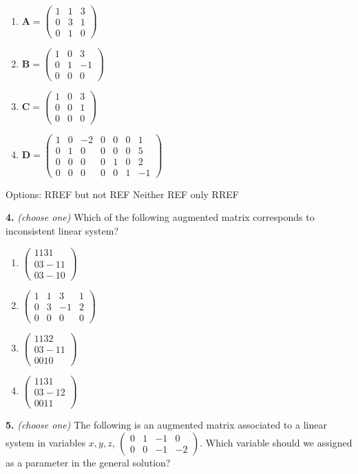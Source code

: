 \documentclass[10pt,a4paper]{article}
\begin{document}
\begin{enumerate}[label=(\alph*)]
\item \(\mathbf{A}=\left(\begin{array}{cc|c}1&1&3\\0&3&1\\0&1&0\end{array}\right)\)
\item \(\mathbf{B}=\left(\begin{array}{cc|c}1&0&3\\0&1&-1\\0&0&0\end{array}\right)\)
\item \(\mathbf{C}=\left(\begin{array}{cc|c}1&0&3\\0&0&1\\0&0&0\end{array}\right)\)
\item \(\mathbf{D}=\left(\begin{array}{cccccc|c}1&0&-2&0&0&0&1\\0&1&0&0&0&0&5\\0&0&0&0&1&0&2\\0&0&0&0&0&1&-1\end{array}\right)\)
\end{enumerate}
\quad Options: RREF but not REF \textbar{} Neither \textbar{} REF only \textbar{} RREF

\smallskip
\textbf{4.} \textit{(choose one)} Which of the following augmented matrix corresponds to inconsistent linear system?

\begin{enumerate}[label=(\Alph*)]
\item \(\left(\begin{array}{ccc|c}1131\\03-11\\03-10\end{array}\right)\)
\item \(\left(\begin{array}{ccc|c}1&1&3&1\\0&3&-1&2\\0&0&0&0\end{array}\right)\)
\item \(\left(\begin{array}{ccc|c}1132\\03-11\\0010\end{array}\right)\)
\item \(\left(\begin{array}{ccc|c}1131\\03-12\\0011\end{array}\right)\)
\end{enumerate}
\smallskip
\textbf{5.} \textit{(choose one)} The following is an augmented matrix associated to a linear system in variables \(x,y,z\), \(\left(\begin{array}{ccc|c}0&1&-1&0\\0&0&-1&-2\end{array}\right)\). Which variable should we assigned as a parameter in the general solution?
\end{document}
